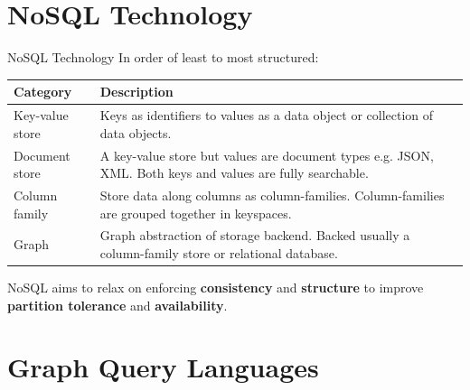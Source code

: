 \section{NoSQL Technology}

\begin{frame}{NoSQL Technology}
    In order of least to most structured:
    \vfill
    \begin{tabular}{p{2.4cm}|p{7.5cm}}
        \textbf{Category} & \textbf{Description} \\
        \hline
        \hline
        Key-value store & Keys as identifiers to values as a data object or collection of data objects. \\
        \hline
        Document store & A key-value store but values are document types e.g. JSON, XML. Both keys and values are fully searchable. \\
        \hline
        Column family & Store data along columns as column-families. Column-families are grouped together in keyspaces. \\
        \hline
        Graph & Graph abstraction of storage backend. Backed usually a column-family store or relational database.\\
    \end{tabular}
    \vfill
    NoSQL aims to relax on enforcing \textbf{consistency} and \textbf{structure} to improve \textbf{partition tolerance} and \textbf{availability}.
\end{frame}

\section{Graph Query Languages}

